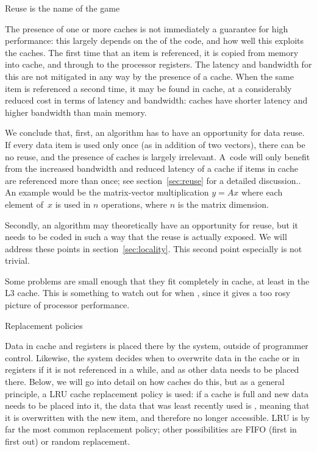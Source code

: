  {Reuse is the name of the game}

The presence of one or more caches is not immediately a guarantee for
high performance: this largely depends on the  of the code, and how well this exploits the caches.
The first time that an item is
referenced, it is copied from memory into cache, and through to the
processor registers. The latency and bandwidth for this are not mitigated in any
way by the presence of a cache. When the same item is referenced a
second time, it may be found in cache, at a considerably reduced cost
in terms of latency and bandwidth: caches have shorter latency and
higher bandwidth than main memory.

We conclude that, first, an algorithm has to have an opportunity for
data reuse. If every data item is used only once (as in addition of
two vectors), there can be no reuse, and the presence of caches is
largely irrelevant. A~code will only benefit from the increased
bandwidth and reduced latency of a cache if items in cache are
referenced more than once; see section~\ref{sec:reuse} for a detailed
discussion.. An example would be the matrix-vector multiplication
$y=Ax$ where each element of~$x$ is used in $n$ operations, where $n$
is the matrix dimension.

Secondly, an algorithm may theoretically
have an opportunity for reuse, but it needs to be coded in such a way
that the reuse is actually exposed. We will address these points in
section~\ref{sec:locality}. This second point especially is not
trivial.

Some problems are small enough that they fit completely in cache, at
least in the L3 cache. This is something to watch out for when
, since it gives a too rosy picture of
processor performance.

 {Replacement policies}
\label{sec:lru}

Data in cache and registers is placed there by the system, outside of
programmer control. Likewise, the system decides when to overwrite
data in the cache or in registers if it is not referenced in a while,
and as other data needs to be placed there.  Below, we will go into
detail on how caches do this, but as a general principle, a \acf{LRU}
cache replacement policy is used: if a cache is full and new data
needs to be placed into it, the data that was least recently used is
, meaning that it is overwritten with the new item,
and therefore no longer accessible. LRU is by far the most common
replacement policy; other possibilities are FIFO (first in first out)
or random replacement.

